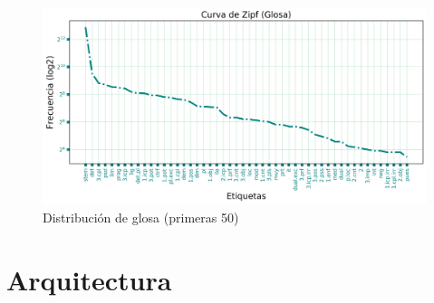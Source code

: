 \documentclass[letterpaper,12pt,oneside]{book}
\begin{document}
	
	\begin{figure}

		\centering

		\includegraphics[width=\textwidth]{zipf_gloss}

		\caption{Distribución de glosa (primeras 50)}

	\end{figure}

	

	


	
	\section{Arquitectura}

	












\end{document}

